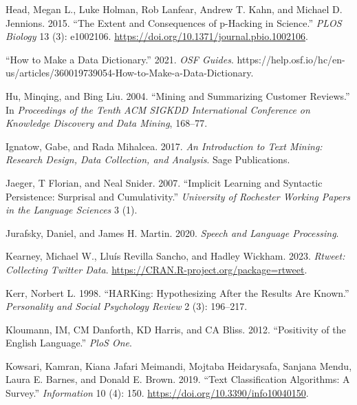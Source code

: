 \documentclass[
  letterpaper,
]{latex/krantz}
\newlength{\cslhangindent}
\newlength{\cslentryspacingunit} %
\newenvironment{CSLReferences}[2] %
 {%
  \setlength{\parindent}{0pt}
  \ifodd #1
  \let\oldpar\par
  \def\par{\hangindent=\cslhangindent\oldpar}
  \fi
  \setlength{\parskip}{#2\cslentryspacingunit}
 }%
 {}
\begin{document}
\begin{CSLReferences}{1}{0}
\leavevmode{}%
Head, Megan L., Luke Holman, Rob Lanfear, Andrew T. Kahn, and Michael D.
Jennions. 2015. {``The Extent and Consequences of p-Hacking in
Science.''} \emph{PLOS Biology} 13 (3): e1002106.
\url{https://doi.org/10.1371/journal.pbio.1002106}.

\leavevmode{}%
{``How to Make a Data Dictionary.''} 2021. \emph{OSF Guides}.
https://help.osf.io/hc/en-us/articles/360019739054-How-to-Make-a-Data-Dictionary.

\leavevmode{}%
Hu, Minqing, and Bing Liu. 2004. {``Mining and Summarizing Customer
Reviews.''} In \emph{Proceedings of the Tenth ACM SIGKDD International
Conference on Knowledge Discovery and Data Mining}, 168--77.

\leavevmode{}%
Ignatow, Gabe, and Rada Mihalcea. 2017. \emph{An Introduction to Text
Mining: Research Design, Data Collection, and Analysis}. Sage
Publications.

\leavevmode{}%
Jaeger, T Florian, and Neal Snider. 2007. {``Implicit Learning and
Syntactic Persistence: Surprisal and Cumulativity.''} \emph{University
of Rochester Working Papers in the Language Sciences} 3 (1).

\leavevmode{}%
Jurafsky, Daniel, and James H. Martin. 2020. \emph{Speech and Language
Processing}.

\leavevmode{}%
Kearney, Michael W., Lluís Revilla Sancho, and Hadley Wickham. 2023.
\emph{Rtweet: Collecting Twitter Data}.
\url{https://CRAN.R-project.org/package=rtweet}.

\leavevmode{}%
Kerr, Norbert L. 1998. {``HARKing: Hypothesizing After the Results Are
Known.''} \emph{Personality and Social Psychology Review} 2 (3):
196--217.

\leavevmode{}%
Kloumann, IM, CM Danforth, KD Harris, and CA Bliss. 2012. {``Positivity
of the English Language.''} \emph{PloS One}.

\leavevmode{}%
Kowsari, Kamran, Kiana Jafari Meimandi, Mojtaba Heidarysafa, Sanjana
Mendu, Laura E. Barnes, and Donald E. Brown. 2019. {``Text
Classification Algorithms: A Survey.''} \emph{Information} 10 (4): 150.
\url{https://doi.org/10.3390/info10040150}.


\end{CSLReferences}
\end{document}
